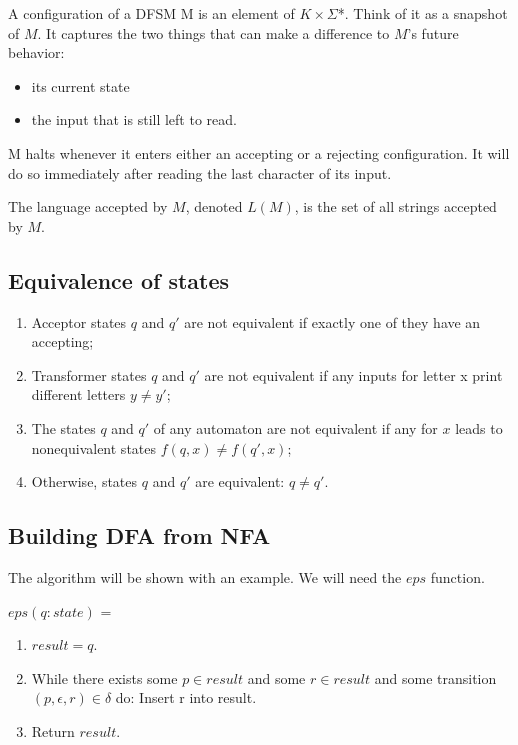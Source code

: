 \documentclass[hidelinks,12pt]{article}
\begin{document}
A configuration of a DFSM M is an element of $K \times \Sigma$*. Think of it as a snapshot
of $M$. It captures the two things that can make a difference to $M$’s future
behavior:

\begin{itemize}
    \item its current state 
    \item the input that is still left to read.
\end{itemize}

M halts whenever it enters either an accepting or a rejecting configuration. It
will do so immediately after reading the last character of its input.

The language accepted by $M$, denoted $L(M)$, is the set of all strings accepted by
$M$.

\subsection{Equivalence of states}

\begin{enumerate}
    \item Acceptor states $q$ and $q'$ are not equivalent if exactly one of
        they have an accepting;

    \item Transformer states $q$ and $q'$ are not equivalent if any inputs
        for letter x print different letters $y \ne y'$;

    \item The states $q$ and $q'$ of any automaton are not equivalent if any
        for $x$ leads to nonequivalent states $f(q,x) \ne f(q',x)$;

    \item Otherwise, states $q$ and $q'$ are equivalent: $q \ne q'$.
\end{enumerate}

\subsection{Building DFA from NFA}

The algorithm will be shown with an example. We will need the $eps$ function.

$eps(q: state)$ =
\begin{enumerate}
    \item $result = {q}$.
    \item While there exists some $p \in result$ and some $r \in result$ and some transition $(p, \epsilon, r) \in \delta$ do:
        Insert r into result.
    \item Return $result$.
\end{enumerate}
\end{document}
